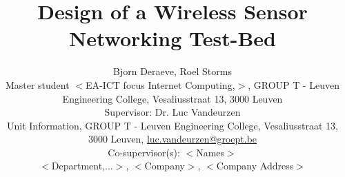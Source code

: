 \documentclass[a4paper]{article}
\begin{document}
\title{Design of a Wireless Sensor Networking Test-Bed}

\author{Bjorn Deraeve\supit{*}, Roel Storms\supit{*} \\ \vspace*{0.25cm}
            \small{\supit{*}Master student $<$EA-ICT focus Internet Computing,$>$, GROUP T - Leuven Engineering College, Vesaliusstraat 13, 3000 Leuven \\ \vspace*{1.5cm}
            Supervisor: Dr. Luc Vandeurzen \\            
            Unit Information, GROUP T - Leuven Engineering College, Vesaliusstraat 13, 3000 Leuven, \href{mailto:luc.vandeurzen@groept.be}{luc.vandeurzen@groept.be}} \\ \vspace*{1em}
            Co-supervisor(s): $<$Names$>$\\
            $<$Department,$\ldots>$, $<$Company$>$, $<$Company Address$>$\\
            }
  

\pagebreak  




\end{document}
